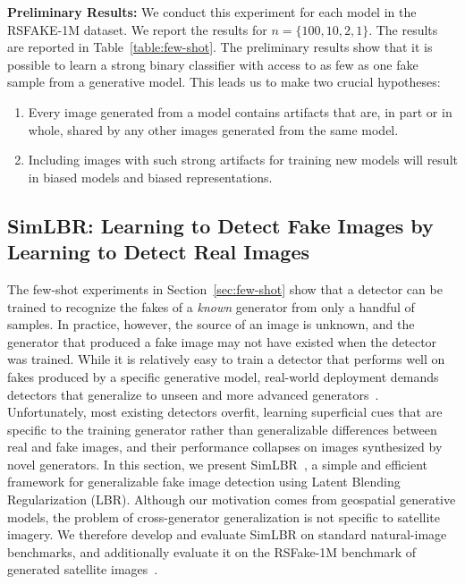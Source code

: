 \noindent\textbf{Preliminary Results:}
We conduct this experiment for each model in the RSFAKE-1M dataset. We report the results for $n=\{100,10,2,1\}$. The results are reported in Table~\ref{table:few-shot}. The preliminary results show that it is possible to learn a strong binary classifier with access to as few as one fake sample from a generative model. This leads us to make two crucial hypotheses:
\begin{enumerate}
    \item Every image generated from a model contains artifacts that are, in part or in whole, shared by any other images generated from the same model.
    \item Including images with such strong artifacts for training new models will result in biased models and biased representations.
\end{enumerate}

\subsection{SimLBR: Learning to Detect Fake Images by Learning to Detect Real Images}
\label{sec:simlbr}
The few-shot experiments in Section~\ref{sec:few-shot} show that a detector can be trained to recognize the fakes of a \textit{known} generator from only a handful of samples. In practice, however, the source of an image is unknown, and the generator that produced a fake image may not have existed when the detector was trained. While it is relatively easy to train a detector that performs well on fakes produced by a specific generative model, real-world deployment demands detectors that generalize to unseen and more advanced generators~\cite{ojha2023towards,yansanity,zhong2023patchcraft}. Unfortunately, most existing detectors overfit, learning superficial cues that are specific to the training generator rather than generalizable differences between real and fake images, and their performance collapses on images synthesized by novel generators. In this section, we present SimLBR~\cite{dhakal2026simlbr}, a simple and efficient framework for generalizable fake image detection using Latent Blending Regularization (LBR). Although our motivation comes from geospatial generative models, the problem of cross-generator generalization is not specific to satellite imagery. We therefore develop and evaluate SimLBR on standard natural-image benchmarks, and additionally evaluate it on the RSFake-1M benchmark of generated satellite images~\cite{tan2025rsfake}.

